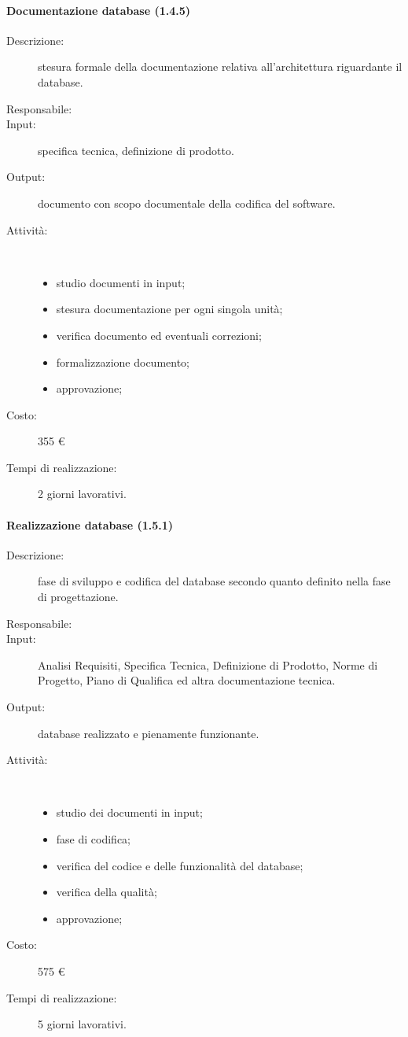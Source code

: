 \begin{description}
\paragraph{Documentazione database (1.4.5)}
\begin{description}
\item[Descrizione:] stesura formale della documentazione relativa all'architettura riguardante il database.
\item[Responsabile:] 
\item[Input:] specifica tecnica, definizione di prodotto.
\item[Output:] documento con scopo documentale della codifica del software.
\item[Attività:]\mbox{}\\[-1.5\baselineskip]
	\begin{itemize}
	\item studio documenti in input;
	\item stesura documentazione per ogni singola unità;
	\item verifica documento ed eventuali correzioni;
	\item formalizzazione documento;
	\item approvazione;
	\end{itemize}
\item[Costo:] 355 \euro{}
\item[Tempi di realizzazione:] 2 giorni lavorativi.
\end{description}

\paragraph{Realizzazione database (1.5.1)}
\begin{description}
\item[Descrizione:] fase di sviluppo e codifica del database secondo quanto definito nella fase di progettazione.
\item[Responsabile:] 
\item[Input:] Analisi Requisiti, Specifica Tecnica, Definizione di Prodotto, Norme di Progetto, Piano di Qualifica ed altra documentazione tecnica.
\item[Output:]database realizzato e pienamente funzionante.
\item[Attività:]\mbox{}\\[-1.5\baselineskip]
	\begin{itemize}
	\item studio dei documenti in input;
	\item fase di codifica;
	\item verifica del codice e delle funzionalit\`{a} del database;
	\item verifica della qualit\`{a};
	\item approvazione;
	\end{itemize}
\item[Costo:] 575 \euro{}
\item[Tempi di realizzazione:] 5 giorni lavorativi.
\end{description}


\end{description}

